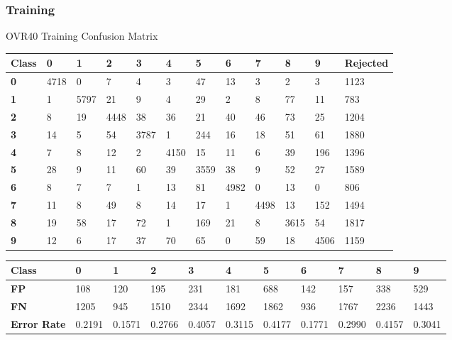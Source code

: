 \documentclass[
  a4paper,            %
  DIV=10,             %
  oneside,            %
  BCOR=5mm,           %
  parskip=half,       %
  numbers=noenddot,   %
  bibtotoc,           %
  listof=totoc,        %
  article
]{scrreprt}
\begin{document}
\subsubsection{Training}
\begin{center}
  \small{OVR40 Training Confusion Matrix}
  \begin{tabular}{|p{1cm}|p{1cm}|p{1cm}|p{1cm}|p{1cm}|p{1cm}|p{1cm}|p{1cm}|p{1cm}|p{1cm}|p{1cm}|p{1.7cm}|}
    \hline
    \textbf{Class} & \textbf{0} & \textbf{1} & \textbf{2} & \textbf{3} & \textbf{4} & \textbf{5} & \textbf{6} & \textbf{7} & \textbf{8} & \textbf{9} & \textbf{Rejected} \\
    \hline
    \textbf{0} & 4718 & 0 & 7 & 4 & 3 & 47 & 13 & 3 & 2 & 3 & 1123 \\
    \hline
    \textbf{1} & 1 & 5797 & 21 & 9 & 4 & 29 & 2 & 8 & 77 & 11 & 783 \\
    \hline
    \textbf{2} & 8 & 19 & 4448 & 38 & 36 & 21 & 40 & 46 & 73 & 25 & 1204 \\
    \hline
    \textbf{3} & 14 & 5 & 54 & 3787 & 1 & 244 & 16 & 18 & 51 & 61 & 1880 \\
    \hline
    \textbf{4} & 7 & 8 & 12 & 2 & 4150 & 15 & 11 & 6 & 39 & 196 & 1396 \\
    \hline
    \textbf{5} & 28 & 9 & 11 & 60 & 39 & 3559 & 38 & 9 & 52 & 27 & 1589 \\
    \hline
    \textbf{6} & 8 & 7 & 7 & 1 & 13 & 81 & 4982 & 0 & 13 & 0 & 806 \\
    \hline
    \textbf{7} & 11 & 8 & 49 & 8 & 14 & 17 & 1 & 4498 & 13 & 152 & 1494 \\
    \hline
    \textbf{8} & 19 & 58 & 17 & 72 & 1 & 169 & 21 & 8 & 3615 & 54 & 1817 \\
    \hline
    \textbf{9} & 12 & 6 & 17 & 37 & 70 & 65 & 0 & 59 & 18 & 4506 & 1159 \\
    \hline
  \end{tabular}
\end{center}

\begin{center}
  \begin{tabular}{|p{1cm}|p{1cm}|p{1cm}|p{1cm}|p{1cm}|p{1cm}|p{1cm}|p{1cm}|p{1cm}|p{1cm}|p{1cm}|}
    \hline
    \textbf{Class} & \textbf{0} & \textbf{1} & \textbf{2} & \textbf{3} & \textbf{4} & \textbf{5} & \textbf{6} & \textbf{7} & \textbf{8} & \textbf{9} \\
    \hline
    \textbf{FP} & 108 & 120 & 195 & 231 & 181 & 688 & 142 & 157 & 338 & 529 \\
    \hline
    \textbf{FN} & 1205 & 945 & 1510 & 2344 & 1692 & 1862 & 936 & 1767 & 2236 & 1443 \\
    \hline
    \textbf{Error Rate} & 0.2191 & 0.1571 & 0.2766 & 0.4057 & 0.3115 & 0.4177 & 0.1771 & 0.2990 & 0.4157 & 0.3041 \\
    \hline
  \end{tabular}
\end{center}
\end{document}
